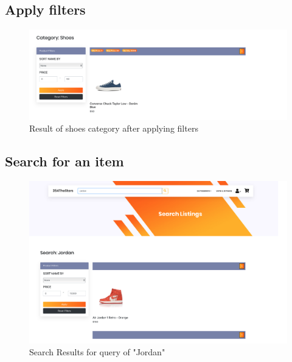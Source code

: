 \documentclass[11pt]{article}
\begin{document}
\subsection{Apply filters}
\begin{figure}[ht!]
    \centering
    \includegraphics[width=\textwidth,height=0.15\paperheight,keepaspectratio]{Diagrams/External_Interfaces/Categories_filtered.png} 
    \caption{Result of shoes category after applying filters}
    \label{fig: Apply filters}
\end{figure}

\subsection{Search for an item}
\begin{figure}[ht!]
    \centering
    \includegraphics[width=\textwidth,height=0.15\paperheight,keepaspectratio]{Diagrams/External_Interfaces/Search_Listing.png} 
    \caption{Search Results for query of "Jordan"}
    \label{fig: Search For An Item}
\end{figure}
\end{document}
